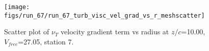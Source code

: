\begin{figure}[H]
\centering
\texttt{[image: figs/run\_67/run\_67\_turb\_visc\_vel\_grad\_vs\_r\_meshscatter]}
\caption{Scatter plot of $\nu_T$ velocity gradient term vs radius at $z/c$=10.00, $V_{free}$=27.05, station 7.}
\label{fig:run_67_turb_visc_vel_grad_vs_r_meshscatter}
\end{figure}


